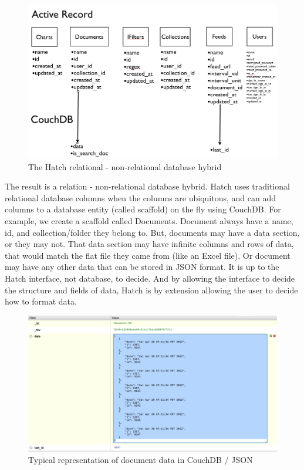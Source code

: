 \begin{figure}[h]
	\begin{center}
	\includegraphics[width=120mm]{images/hatch_db_hybrid}
	\caption{The Hatch relational - non-relational database hybrid} 
	\label{hatch_db_hybrid}
	\end{center}
\end{figure}

The result is a relation - non-relational database hybrid. Hatch uses traditional 
relational database columns when the columns are ubiquitous, and can add columns to
a database entity (called scaffold) on the fly using CouchDB. For example, we create
a scaffold called Documents. Document always have a name, id, and collection/folder
they belong to. But, documents may have a data section, or they may not. That
data section may have infinite columns and rows of data, that would match the flat 
file they came from (like an Excel file). Or document may have any other data that
can be stored in JSON format. It is up to the Hatch interface, not database, to 
decide. And by allowing the interface to decide the structure and fields of data, Hatch
is by extension allowing the user to decide how to format data.

\pagebreak

\begin{figure}[h]
	\begin{center}
	\includegraphics[width=120mm]{images/couchdb_json_ex}
	\caption{Typical representation of document data in CouchDB / JSON} 
	\label{couchdb_json_ex}
	\end{center}
\end{figure}

